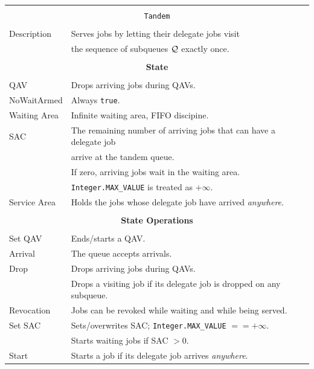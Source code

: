 \documentclass[12pt]{book}
\begin{document}
\begin{tabular}{|l|l|}
\hline
\multicolumn{2}{|c|}{} \\
\multicolumn{2}{|c|}{\lstinline[basicstyle=\large]{Tandem}} \\
\multicolumn{2}{|c|}{} \\
\hline
Description & Serves jobs by letting their delegate jobs visit \\
            & the sequence of subqueues $\cal{Q}$ exactly once. \\
\hline
\multicolumn{2}{|c|}{} \\
\multicolumn{2}{|c|}{\bf State} \\
\multicolumn{2}{|c|}{} \\
\hline
QAV & Drops arriving jobs during QAVs. \\
\hline
NoWaitArmed & Always \lstinline|true|. \\
\hline
Waiting Area & Infinite waiting area, FIFO discipine. \\
\hline
SAC & The remaining number of arriving jobs that can have a delegate job \\
    & arrive at the tandem queue. \\
    & If zero, arriving jobs wait in the waiting area. \\
    & \lstinline|Integer.MAX_VALUE| is treated as $+\infty$. \\
\hline
Service Area & Holds the jobs whose delegate job have arrived {\em anywhere}. \\
\hline
\multicolumn{2}{|c|}{} \\
\multicolumn{2}{|c|}{\bf State Operations} \\
\multicolumn{2}{|c|}{} \\
\hline
Set QAV & Ends/starts a QAV. \\
\hline
Arrival & The queue accepts arrivals. \\
\hline
Drop & Drops arriving jobs during QAVs. \\
     & Drops a visiting job if its delegate job is dropped on any subqueue. \\
\hline
Revocation & Jobs can be revoked while waiting and while being served. \\
\hline
Set SAC & Sets/overwrites SAC; \lstinline|Integer.MAX_VALUE| $== +\infty$. \\
        & Starts waiting jobs if SAC $> 0$. \\
\hline
Start & Starts a job if its delegate job arrives {\em anywhere}. \\

\end{tabular}
\end{document}
